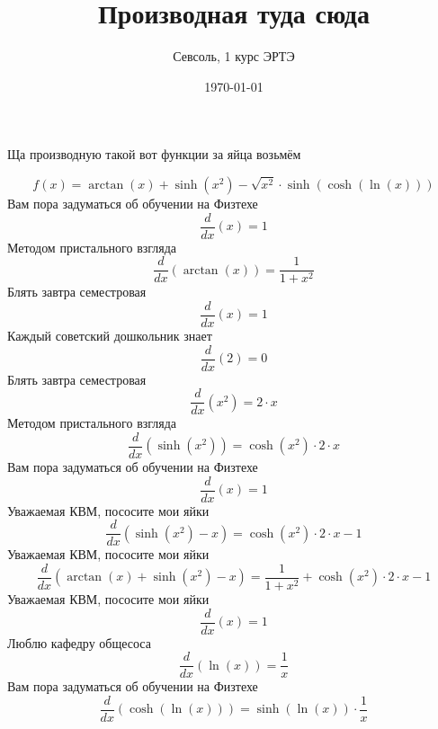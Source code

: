 \documentclass[12pt, a4paper]{article}
\begin{document}
\title{Производная туда сюда
}\author{Севсоль, 1 курс ЭРТЭ}
\date{\today}
\maketitle 
\centerline{Ща производную такой вот функции за яйца возьмём}
\begin{equation}
f(x) = \arctan(x)+\sinh({x}^{2})-\sqrt{{x}^{2}} \cdot \sinh(\cosh(\ln(x)))
\end{equation}
Вам пора задуматься об обучении на Физтехе
\begin{equation}
\frac{d}{dx}(x) = 1
\end{equation}
Методом пристального взгляда
\begin{equation}
\frac{d}{dx}(\arctan(x)) = \frac{1}{1+{x}^{2}}
\end{equation}
Блять завтра семестровая
\begin{equation}
\frac{d}{dx}(x) = 1
\end{equation}
Каждый советский дошкольник знает
\begin{equation}
\frac{d}{dx}(2) = 0
\end{equation}
Блять завтра семестровая
\begin{equation}
\frac{d}{dx}({x}^{2}) = 2 \cdot x
\end{equation}
Методом пристального взгляда
\begin{equation}
\frac{d}{dx}(\sinh({x}^{2})) = \cosh({x}^{2}) \cdot 2 \cdot x
\end{equation}
Вам пора задуматься об обучении на Физтехе
\begin{equation}
\frac{d}{dx}(x) = 1
\end{equation}
Уважаемая КВМ, пососите мои яйки
\begin{equation}
\frac{d}{dx}(\sinh({x}^{2})-x) = \cosh({x}^{2}) \cdot 2 \cdot x-1
\end{equation}
Уважаемая КВМ, пососите мои яйки
\begin{equation}
\frac{d}{dx}(\arctan(x)+\sinh({x}^{2})-x) = \frac{1}{1+{x}^{2}}+\cosh({x}^{2}) \cdot 2 \cdot x-1
\end{equation}
Уважаемая КВМ, пососите мои яйки
\begin{equation}
\frac{d}{dx}(x) = 1
\end{equation}
Люблю кафедру общесоса
\begin{equation}
\frac{d}{dx}(\ln(x)) = \frac{1}{x}
\end{equation}
Вам пора задуматься об обучении на Физтехе
\begin{equation}
\frac{d}{dx}(\cosh(\ln(x))) = \sinh(\ln(x)) \cdot \frac{1}{x}
\end{equation}
\end{document}
